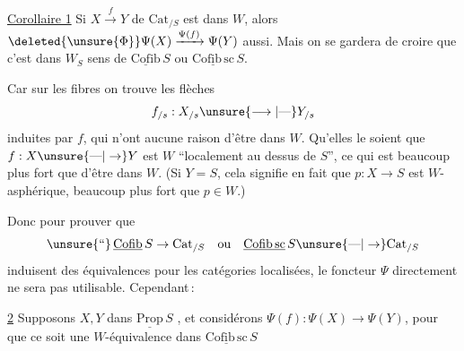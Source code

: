 
\uline{Corollaire 1} Si $X\xrightarrow{f}Y$ de $\mathrm{Cat}_{/S}$ est dans $W$, alors $\deleted{\unsure{\Phi}}\Psi(X)\xrightarrow{\Psi(f)}\Psi(Y)$ aussi. Mais on se gardera de croire que c'est dans $W_S$  sens de $\underline{\mathrm{Cofib}}\,S$ ou $\underline{\mathrm{Cofib}\,\mathrm{sc}}\,S$.

Car sur les fibres   on trouve les flèches
\[ f_{/s}:X_{/s}\unsure{\longrightarrow|\text{---}}Y_{/s} \]
induites par $f$, qui n'ont aucune raison d'être dans $W$. Qu'elles le soient  que $f:X\unsure{\text{---}|\to}Y$ est  $W$ ``localement au dessus de $S$'', ce qui  est beaucoup plus fort que d'être dans $W$. (Si $Y=S$, cela signifie en fait que $p:X\to S$ est $W$-asphérique, beaucoup plus fort que  $p\in W$.)

Donc \deleted{$\unsure{\Psi}$} pour prouver que
\[ \unsure{\text{``}}\,\underline{\mathrm{Cofib}}\,S\to\mathrm{Cat}_{/S}\quad\text{ou}\quad \underline{\mathrm{Cofib}\,\mathrm{sc}}\,S\unsure{\text{---}|\to}\mathrm{Cat}_{/S} \]
induisent des équivalences pour les catégories localisées, le foncteur $\Psi$ directement ne  sera pas utilisable. Cependant\,:

\uline{ 2} Supposons $X,Y$ dans $\underline{\mathrm{Prop}}\,S$ , et considérons $\Psi(f):\Psi(X)\to\Psi(Y)$, pour que ce soit une $W$-équivalence dans $\underline{\mathrm{Cofib}\,\mathrm{sc}}\,S$ 


